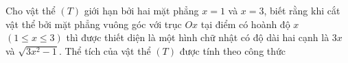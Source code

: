\begin{ex}
Cho vật thể $(T)$ giới hạn bởi hai mặt phẳng $x=1$ và $x=3$, biết rằng khi cắt vật thể bởi mặt phẳng vuông góc với trục $Ox$ tại điểm có hoành độ $x$ $(1\le x\le3)$ thì được thiết diện là một hình chữ nhật có độ dài hai cạnh là $3x$ và $\sqrt{3x^2-1}$. Thể tích của vật thể $(T)$ được tính theo công thức
\end{ex}
